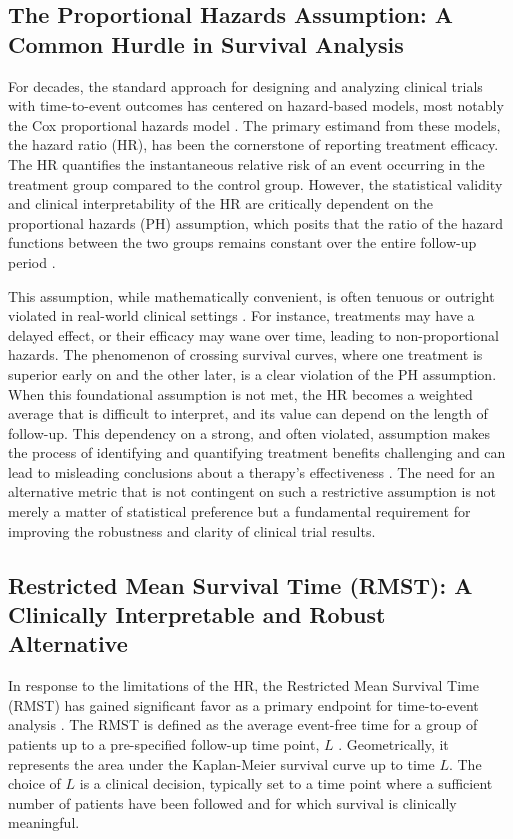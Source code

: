 \documentclass[11pt, a4paper]{article}
\begin{document}
\subsection{The Proportional Hazards Assumption: A Common Hurdle in Survival Analysis}
For decades, the standard approach for designing and analyzing clinical trials with time-to-event outcomes has centered on hazard-based models, most notably the Cox proportional hazards model \cite{[1]}. The primary estimand from these models, the hazard ratio (HR), has been the cornerstone of reporting treatment efficacy. The HR quantifies the instantaneous relative risk of an event occurring in the treatment group compared to the control group. However, the statistical validity and clinical interpretability of the HR are critically dependent on the proportional hazards (PH) assumption, which posits that the ratio of the hazard functions between the two groups remains constant over the entire follow-up period \cite{[1]}.

This assumption, while mathematically convenient, is often tenuous or outright violated in real-world clinical settings \cite{[1]}. For instance, treatments may have a delayed effect, or their efficacy may wane over time, leading to non-proportional hazards. The phenomenon of crossing survival curves, where one treatment is superior early on and the other later, is a clear violation of the PH assumption. When this foundational assumption is not met, the HR becomes a weighted average that is difficult to interpret, and its value can depend on the length of follow-up. This dependency on a strong, and often violated, assumption makes the process of identifying and quantifying treatment benefits challenging and can lead to misleading conclusions about a therapy's effectiveness \cite{[1]}. The need for an alternative metric that is not contingent on such a restrictive assumption is not merely a matter of statistical preference but a fundamental requirement for improving the robustness and clarity of clinical trial results.

\subsection{Restricted Mean Survival Time (RMST): A Clinically Interpretable and Robust Alternative}
In response to the limitations of the HR, the Restricted Mean Survival Time (RMST) has gained significant favor as a primary endpoint for time-to-event analysis \cite{royston2013, uno2014}. The RMST is defined as the average event-free time for a group of patients up to a pre-specified follow-up time point, $L$ \cite{[1]}. Geometrically, it represents the area under the Kaplan-Meier survival curve up to time $L$. The choice of $L$ is a clinical decision, typically set to a time point where a sufficient number of patients have been followed and for which survival is clinically meaningful.
\end{document}
